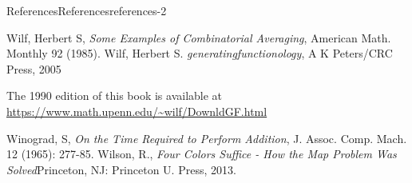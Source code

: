 \documentclass[twoside,10pt,]{book}
\numberwithin{equation}{section}
\begin{document}
\begin{references-chapter-numberless}{References}{}{References}{}{}{references-2}
\begin{referencelist}
\hypertarget{biblio-wilf-1985}{}Wilf, Herbert S, \textit{Some Examples of Combinatorial Averaging}, American Math. Monthly 92 (1985).
\hypertarget{biblio-wilf-1990}{}Wilf, Herbert S. \textit{generatingfunctionology}, A K Peters\slash{}CRC Press, 2005\par\hypertarget{note-41}{}
\hypertarget{p-6224}{}%
The 1990 edition of this book is available at \href{https://www.math.upenn.edu/\~wilf/DownldGF.html}{https:\slash{}\slash{}www.math.upenn.edu\slash{}\textasciitilde{}wilf\slash{}DownldGF.html}%

\hypertarget{biblio-winograd-1965}{}Winograd, S, \textit{On the Time Required to Perform Addition}, J. Assoc. Comp. Mach. 12 (1965): 277-85.
\hypertarget{biblio-wilson-2013}{}Wilson, R., \textit{Four Colors Suffice - How the Map Problem Was Solved}Princeton, NJ: Princeton U. Press, 2013.
\end{referencelist}
\end{references-chapter-numberless}
%
\printindex
%
\end{document}
